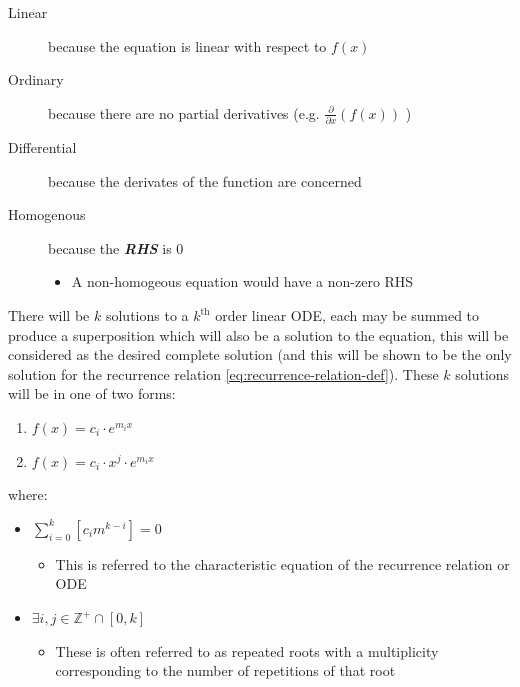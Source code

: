 \documentclass[11pt]{article}
\begin{document}
\begin{description}
\item[{Linear}] because the equation is linear with respect to \(f(x)\)
\item[{Ordinary}] because there are no partial derivatives (e.g. \(\frac{\partial }{\partial x}{\left({ f{\left({ x }\right)} }\right)}\)  )
\item[{Differential}] because the derivates of the function are concerned
\item[{Homogenous}] because the \textbf{\emph{RHS}} is 0
\begin{itemize}
\item A non-homogeous equation would have a non-zero RHS
\end{itemize}
\end{description}

There will be \(k\) solutions to a \(k^{\mathrm{th}}\) order linear ODE, each may be summed to produce a superposition which will also be a solution to the equation, \cite[Ch. 4]{zillDifferentialEquations2009a}  this will be considered as the desired complete solution (and this will be shown to be the only solution for the recurrence relation \eqref{eq:recurrence-relation-def}). These \(k\) solutions will be in one of two forms:

\begin{enumerate}
\item \(f(x)=c_{i} \cdot e^{m_{i}x}\)
\item \(f(x)=c_{i} \cdot x^{j}\cdot e^{m_{i}x}\)
\end{enumerate}

where:

\begin{itemize}
\item \(\sum^{k}_{i=0}\left[  c_{i}m^{k-i} \right] = 0\)
\begin{itemize}
\item This is referred to the characteristic equation of the recurrence relation or ODE \cite{levinSolvingRecurrenceRelations2018}
\end{itemize}
\item \(\exists i,j \in \mathbb{Z}^{+} \cap \left[0,k\right]\)
\begin{itemize}
\item These is often referred to as repeated roots \cite{levinSolvingRecurrenceRelations2018,zillMatrixExponential2009} with a multiplicity corresponding to the number of repetitions of that root \cite[]{nicodemiIntroductionAbstractAlgebra2007}
\end{itemize}
\end{itemize}
\end{document}

